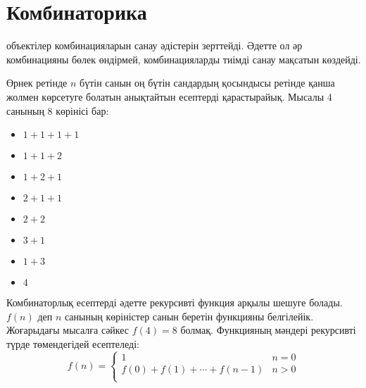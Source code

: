 \chapter{Комбинаторика}


 объектілер 
комбинацияларын санау әдістерін зерттейді. 
Әдетте ол әр комбинацияны бөлек өндірмей, 
комбинацияларды тиімді санау мақсатын көздейді.


Өрнек ретінде $n$ бүтін санын оң бүтін сандардың 
қосындысы ретінде қанша жолмен көрсетуге болатын анықтайтын есептерді қарастырайық.
Мысалы 4 санының 8 көрінісі бар:
\begin{multicols}{2}
\begin{itemize}
\item $1+1+1+1$
\item $1+1+2$
\item $1+2+1$
\item $2+1+1$
\item $2+2$
\item $3+1$
\item $1+3$
\item $4$
\end{itemize}
\end{multicols}

Комбинаторлық есептерді әдетте рекурсивті функция 
арқылы шешуге болады. $f(n)$ деп $n$ 
санының көріністер санын беретін 
функцияны белгілейік. Жоғарыдағы
мысалға сәйкес $f(4)=8$ болмақ. Функцияның мәндері 
рекурсивті түрде төмендегідей есептеледі:
\begin{equation*}
    f(n) = \begin{cases}
               1               & n = 0\\
               f(0)+f(1)+\cdots+f(n-1) & n > 0\\
           \end{cases}
\end{equation*}

